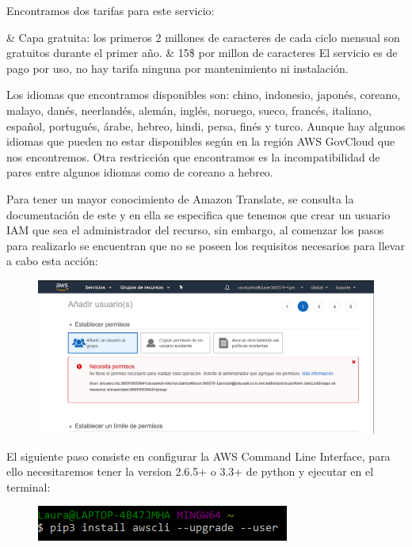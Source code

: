 \documentclass[english,runningheads,a4paper]{llncs}[2018/03/10]
\begin{document}
    Encontramos dos tarifas para este servicio:
    \begin{easylist}[itemize]
        & Capa gratuita: los primeros 2 millones de caracteres de cada 
        ciclo mensual son gratuitos durante el primer año.
        & 15\$ por millon de caracteres
El servicio es de pago por uso, no hay tarifa ninguna por mantenimiento       ni instalación.
    \end{easylist} 
    Los idiomas que encontramos disponibles son: chino, indonesio, japonés, 
    coreano, malayo, danés, neerlandés, alemán, inglés, noruego, sueco, francés,
    italiano, español, portugués, árabe, hebreo, hindi, persa, finés y turco. 
    Aunque hay algunos idiomas que pueden no estar disponibles según en la 
    región AWS GovCloud que nos encontremos. Otra restricción que encontramos 
    es la incompatibilidad de pares entre algunos idiomas como de coreano a 
    hebreo.
    
    
    Para tener un mayor conocimiento de Amazon Translate, se consulta la 
    documentación de este y en ella se especifica que tenemos que crear un 
    usuario IAM que sea el administrador del recurso, sin embargo, al comenzar 
    los pasos para realizarlo se encuentran que no se poseen los requisitos 
    necesarios para llevar a cabo esta acción:
    
    \begin{figure}[H]
        \centering
        \includegraphics[scale=0.5]{./IA/AWS/denyedpermissionAWS.png}
    \end{figure}
    
    El siguiente paso consiste en configurar la AWS Command Line Interface, 
    para  ello necesitaremos tener la version 2.6.5+ o 3.3+ de python y 
    ejecutar en el terminal:
    
    \begin{figure}[H]
        \centering
        \includegraphics[scale=0.8]{./IA/AWS/pipAWS.png}
    \end{figure}
    
\end{document}

